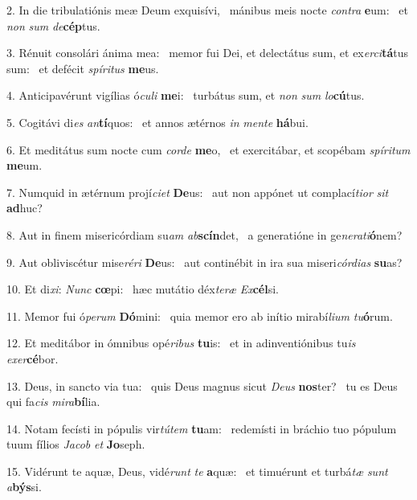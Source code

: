 2. In die tribulatiónis meæ Deum exquisívi, \dag\  mánibus meis nocte \textit{con}\textit{tra} \textbf{e}um: \ast\  et \textit{non} \textit{sum} \textit{de}\textbf{cép}tus.\

3. Rénuit consolári ánima mea: \dag\  memor fui Dei, et delectátus sum, et ex\textit{er}\textit{ci}\textbf{tá}tus sum: \ast\  et defécit \textit{spí}\textit{ri}\textit{tus} \textbf{me}us.\

4. Anticipavérunt vigílias ó\textit{cu}\textit{li} \textbf{me}i: \ast\  turbátus sum, et \textit{non} \textit{sum} \textit{lo}\textbf{cú}tus.\

5. Cogitávi di\textit{es} \textit{an}\textbf{tí}quos: \ast\  et annos ætérnos \textit{in} \textit{men}\textit{te} \textbf{há}bui.\

6. Et meditátus sum nocte cum \textit{cor}\textit{de} \textbf{me}o, \ast\  et exercitábar, et scopébam \textit{spí}\textit{ri}\textit{tum} \textbf{me}um.\

7. Numquid in ætérnum projí\textit{ci}\textit{et} \textbf{De}us: \ast\  aut non appónet ut complací\textit{ti}\textit{or} \textit{sit} \textbf{ad}huc?\

8. Aut in finem misericórdiam su\textit{am} \textit{ab}\textbf{scín}det, \ast\  a generatióne in ge\textit{ne}\textit{ra}\textit{ti}\textbf{ó}nem?\

9. Aut obliviscétur mise\textit{ré}\textit{ri} \textbf{De}us: \ast\  aut continébit in ira sua miseri\textit{cór}\textit{di}\textit{as} \textbf{su}as?\

10. Et di\textit{xi}: \textit{Nunc} \textbf{cœ}pi: \ast\  hæc mutátio déx\textit{te}\textit{ræ} \textit{Ex}\textbf{cél}si.\

11. Memor fui ó\textit{pe}\textit{rum} \textbf{Dó}mini: \ast\  quia memor ero ab inítio mirabí\textit{li}\textit{um} \textit{tu}\textbf{ó}rum.\

12. Et meditábor in ómnibus opé\textit{ri}\textit{bus} \textbf{tu}is: \ast\  et in adinventiónibus tu\textit{is} \textit{ex}\textit{er}\textbf{cé}bor.\

13. Deus, in sancto via tua: \dag\  quis Deus magnus sicut \textit{De}\textit{us} \textbf{nos}ter? \ast\  tu es Deus qui fa\textit{cis} \textit{mi}\textit{ra}\textbf{bí}lia.\

14. Notam fecísti in pópulis vir\textit{tú}\textit{tem} \textbf{tu}am: \ast\  redemísti in bráchio tuo pópulum tuum fílios \textit{Ja}\textit{cob} \textit{et} \textbf{Jo}seph.\

15. Vidérunt te aquæ, Deus, vidé\textit{runt} \textit{te} \textbf{a}quæ: \ast\  et timuérunt et turbá\textit{tæ} \textit{sunt} \textit{a}\textbf{býs}si.\

